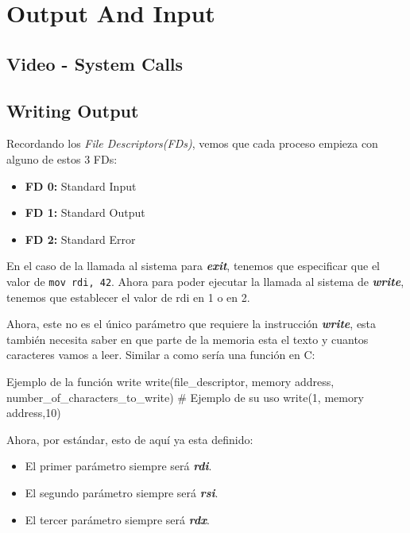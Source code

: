 \section{Output And Input}\label{sec:output_and_input}

\sectiontoc

\subsection{Video - System Calls}\label{subsec:video_system_calls}
\subsection{Writing Output}\label{subsec:writing_output}

Recordando los \textit{File Descriptors(FDs)}, vemos que cada proceso empieza con alguno de estos 3 FDs:

\begin{itemize}
	\item \textbf{FD 0:} Standard Input
	\item \textbf{FD 1:} Standard Output
	\item \textbf{FD 2:} Standard Error
\end{itemize}

En el caso de la llamada al sistema para \textit{\textbf{exit}}, tenemos que
especificar que el valor de \texttt{mov rdi, 42}. Ahora para poder
ejecutar la llamada al sistema de \textit{\textbf{write}}, tenemos que
establecer el valor de rdi en 1 o en 2.


Ahora, este no es el único parámetro que requiere la instrucción
\textit{\textbf{write}}, esta también necesita saber en que parte de la memoria
esta el texto y cuantos caracteres vamos a leer. Similar a como sería una
función en C:

\begin{codebox}[C]{Ejemplo de la función write}
	write(file_descriptor, memory address, number_of_characters_to_write)
	# Ejemplo de su uso
	write(1, memory address,10)
\end{codebox}

Ahora, por estándar, esto de aquí ya esta definido:

\begin{itemize}
	\item El primer parámetro siempre será \textit{\textbf{rdi}}.
	\item El segundo parámetro siempre será \textit{\textbf{rsi}}.
	\item El tercer parámetro siempre será \textit{\textbf{rdx}}.
\end{itemize}


